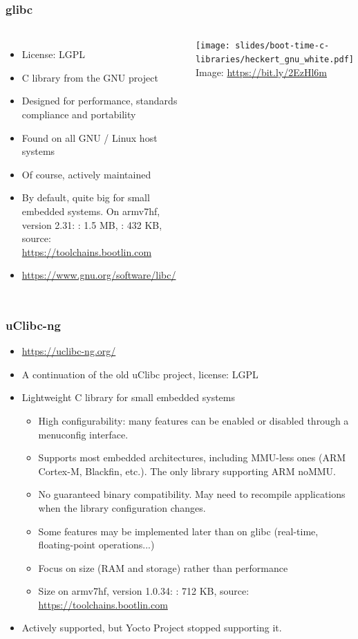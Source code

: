 \begin{frame}
  \frametitle{glibc}
  \begin{columns}
    \begin{itemize}
    \item License: LGPL
    \item C library from the GNU project
    \item Designed for performance, standards compliance and portability
    \item Found on all GNU / Linux host systems
    \item Of course, actively maintained
    \item By default, quite big for small embedded systems.
      On armv7hf, version 2.31: : 1.5 MB, : 432
      KB, source: \url{https://toolchains.bootlin.com}
    \item \url{https://www.gnu.org/software/libc/}
    \end{itemize}
    \vfill
    \minipage[c][0.8\textheight][s]{\columnwidth}
    \texttt{[image: slides/boot-time-c-libraries/heckert\_gnu\_white.pdf]}
    \vfill
    \tiny Image: \url{https://bit.ly/2EzHl6m}
    \endminipage
  \end{columns}
\end{frame}

\begin{frame}
  \frametitle{uClibc-ng}
  \begin{itemize}
  \item \url{https://uclibc-ng.org/}
  \item A continuation of the old uClibc project, license: LGPL
  \item Lightweight C library for small embedded systems
    \begin{itemize}
    \item High configurability: many features can be enabled or
      disabled through a menuconfig interface.
    \item Supports most embedded architectures, including MMU-less
          ones (ARM Cortex-M, Blackfin, etc.). The only library
          supporting ARM noMMU.
    \item No guaranteed binary compatibility. May need to
      recompile applications when the library configuration changes.
    \item Some features may be implemented later than on glibc (real-time,
          floating-point operations...)
    \item Focus on size (RAM and storage) rather than performance
    \item Size on armv7hf, version 1.0.34:
      : 712 KB, source: \url{https://toolchains.bootlin.com}
    \end{itemize}
    \item Actively supported, but Yocto Project stopped supporting it.
  \end{itemize}
\end{frame}

